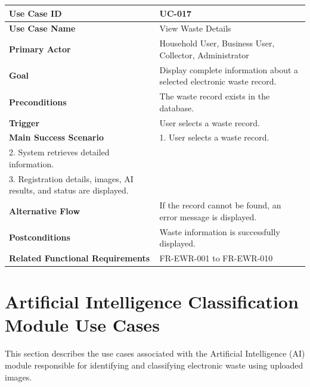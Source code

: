 \begin{longtable}{|p{4cm}|p{10cm}|}

\hline
\textbf{Use Case ID} &
UC-017 \\
\hline

\textbf{Use Case Name} &
View Waste Details \\
\hline

\textbf{Primary Actor} &
Household User, Business User, Collector, Administrator \\
\hline

\textbf{Goal} &
Display complete information about a selected electronic waste record. \\
\hline

\textbf{Preconditions} &
The waste record exists in the database. \\
\hline

\textbf{Trigger} &
User selects a waste record. \\
\hline

\textbf{Main Success Scenario} &
1. User selects a waste record.\\
2. System retrieves detailed information.\\
3. Registration details, images, AI results, and status are displayed.\\
\hline

\textbf{Alternative Flow} &
If the record cannot be found, an error message is displayed.\\
\hline

\textbf{Postconditions} &
Waste information is successfully displayed.\\
\hline

\textbf{Related Functional Requirements} &
FR-EWR-001 to FR-EWR-010 \\
\hline

\end{longtable}

\section{Artificial Intelligence Classification Module Use Cases}
\label{sec:ai-usecases}

This section describes the use cases associated with the Artificial
Intelligence (AI) module responsible for identifying and classifying
electronic waste using uploaded images.

